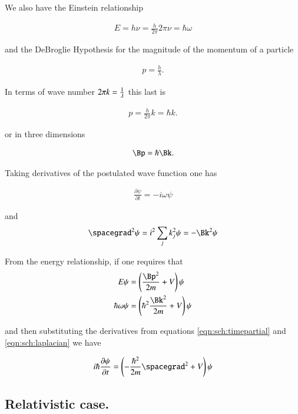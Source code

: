 We also have the Einstein relationship

\begin{align}
E = h \nu = \frac{h}{2\pi} 2 \pi \nu = \hbar \omega
\end{align}

and the DeBroglie Hypothesis for the magnitude of the momentum of a particle

\begin{align*}
p = \frac{h}{\lambda}.
\end{align*}

In terms of wave number $2 \pi k = \frac{1}{\lambda}$ this last is

\begin{align*}
p = \frac{h}{2\pi} k = \hbar k.
\end{align*}

or in three dimensions

\begin{align*}
\Bp = \hbar \Bk.
\end{align*}

Taking derivatives of the postulated wave function one has

\begin{align}\label{eqn:sch:timepartial}
\frac{\partial \psi}{\partial t} = -i \omega \psi
\end{align}

and 
\begin{align}\label{eqn:sch:laplacian}
\spacegrad^2 \psi = i^2 \sum_j k_j^2 \psi = - \Bk^2 \psi
\end{align}

From the energy relationship, if one requires that
\begin{align}
E \psi &= \left(\frac{\Bp^2}{2m} + V\right) \psi \\
\hbar \omega \psi &= \left(\hbar^2 \frac{\Bk^2}{2m} + V\right) \psi \\
\end{align}

and then substituting the derivatives from equations \ref{eqn:sch:timepartial} and \ref{eqn:sch:laplacian} we have

\begin{align*}
i \hbar \PD{t}{\psi} &= \left(-\frac{\hbar^2}{2m} \spacegrad^2  + V\right) \psi \\
\end{align*}

\subsection{Relativistic case. }

